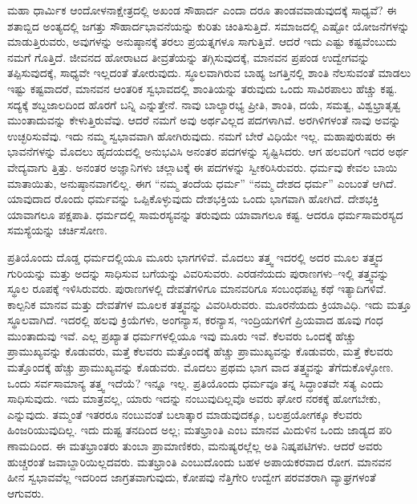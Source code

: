 ಮಹಾ ಧಾರ್ಮಿಕ ಆಂದೋಳನಾಕ್ಷೇತ್ರದಲ್ಲಿ ಅಖಂಡ ಸೌಹಾರ್ದ ಎಂದಾ ದರೂ ತಾಂಡವವಾಡುವುದಕ್ಕೆ ಸಾಧ್ಯವೆ? ಈ ಶತಾಬ್ದಿದ ಅಂತ್ಯದಲ್ಲಿ ಜಗತ್ತು ಸೌಹಾರ್ದಭಾವನೆಯನ್ನು ಕುರಿತು ಚಿಂತಿಸುತ್ತಿದೆ. ಸಮಾಜದಲ್ಲಿ ಎಷ್ಟೋ ಯೋಜನೆಗಳನ್ನು ಮಾಡುತ್ತಿರುವರು, ಅವುಗಳನ್ನು ಅನುಷ್ಠಾನಕ್ಕೆ ತರಲು ಪ್ರಯತ್ನಗಳೂ ಸಾಗುತ್ತಿವೆ. ಆದರೆ ಇದು ಎಷ್ಟು ಕಷ್ಟವೆಂಬುದು ನಮಗೆ ಗೊತ್ತಿದೆ. ಜೀವನದ ಹೋರಾಟದ ತೀವ್ರತೆಯನ್ನು ತಗ್ಗಿಸುವುದಕ್ಕೆ, ಮಾನವನ ಪ್ರಪಂಡ ಉದ್ವೇಗವನ್ನು ತಪ್ಪಿಸುವುದಕ್ಕೆ, ಸಾಧ್ಯವೇ ಇಲ್ಲದಂತೆ ತೋರುವುದು. ಸ್ಥೂಲವಾಗಿರುವ ಬಾಹ್ಯ ಜಗತ್ತಿನಲ್ಲಿ ಶಾಂತಿ ನೆಲಸುವಂತೆ ಮಾಡಲು ಇಷ್ಟು ಕಷ್ಟವಾದರೆ, ಮಾನವನ ಆಂತರಿಕ ಸ್ವಭಾವದಲ್ಲಿ ಶಾಂತಿಯನ್ನು ತರುವುದು ಒಂದು ಸಾವಿರಪಾಲು ಹೆಚ್ಚು ಕಷ್ಟ. ಸದ್ಯಕ್ಕೆ ಶಬ್ದಜಾಲದಿಂದ ಹೊರಗೆ ಬನ್ನಿ ಎನ್ನುತ್ತೇನೆ. ನಾವು ಬಾಲ್ಯಾರಭ್ಯ ಪ್ರೀತಿ, ಶಾಂತಿ, ದಯೆ, ಸಮತ್ವ, ವಿಶ್ವಭ್ರಾತೃತ್ವ ಮುಂತಾದುವನ್ನು ಕೇಳುತ್ತಿರುವೆವು. ಆದರೆ ನಮಗೆ ಅವು ಅರ್ಥವಿಲ್ಲದ ಪದಗಳಾಗಿವೆ. ಅರಗಿಳಿಗಳಂತೆ ನಾವು ಅವನ್ನು ಉಚ್ಛರಿಸುವೆವು. ಇದು ನಮ್ಮ ಸ್ವಭಾವವಾಗಿ ಹೋಗಿರುವುದು. ನಮಗೆ ಬೇರೆ ವಿಧಿಯೇ ಇಲ್ಲ. ಮಹಾಪುರುಷರು ಈ ಭಾವನೆಗಳನ್ನು ಮೊದಲು ಹೃದಯದಲ್ಲಿ ಅನುಭವಿಸಿ ಅನಂತರ ಪದಗಳನ್ನು ಸೃಷ್ಟಿಸಿದರು. ಆಗ ಹಲವರಿಗೆ ಇದರ ಅರ್ಥ ವೇದ್ಯವಾಗು ತ್ತಿತ್ತು. ಅನಂತರ ಅಜ್ಞಾನಿಗಳು ಚಲ್ಲಾಟಕ್ಕೆ ಈ ಪದಗಳನ್ನು ಸ್ವೀಕರಿಸಿರುವರು. ಧರ್ಮವು ಕೇವಲ ಬಾಯಿ ಮಾತಾಯಿತು, ಅನುಷ್ಠಾನವಾಗಲಿಲ್ಲ. ಈಗ “ನಮ್ಮ ತಂದೆಯ ಧರ್ಮ” “ನಮ್ಮ ದೇಶದ ಧರ್ಮ” ಎಂಬಂತೆ ಆಗಿದೆ. ಯಾವುದಾದ ರೊಂದು ಧರ್ಮವನ್ನು ಒಪ್ಪಿಕೊಳ್ಳುವುದು ದೇಶಭಕ್ತಿಯ ಒಂದು ಭಾಗವಾಗಿ ಹೋಗಿದೆ. ದೇಶಭಕ್ತಿ ಯಾವಾಗಲೂ ಪಕ್ಷಪಾತಿ. ಧರ್ಮದಲ್ಲಿ ಸಾಮರಸ್ಯವನ್ನು ತರುವುದು ಯಾವಾಗಲೂ ಕಷ್ಟ. ಆದರೂ ಧರ್ಮಸಾಮರಸ್ಯದ ಸಮಸ್ಯೆಯನ್ನು ಚರ್ಚಿಸೋಣ.

ಪ್ರತಿಯೊಂದು ದೊಡ್ಡ ಧರ್ಮದಲ್ಲಿಯೂ ಮೂರು ಭಾಗಗಳಿವೆ. ಮೊದಲು ತತ್ತ್ವ ಇದರಲ್ಲಿ ಅದರ ಮೂಲ ತತ್ತ್ವದ ಗುರಿಯನ್ನು ಮತ್ತು ಅದನ್ನು ಸಾಧಿಸುವ ಬಗೆಯನ್ನು ವಿವರಿಸುವರು. ಎರಡನೆಯದು ಪುರಾಣಗಳು–ಇಲ್ಲಿ ತತ್ತ್ವವನ್ನು ಸ್ಥೂಲ ರೂಪಕ್ಕೆ ಇಳಿಸಿರುವರು. ಪುರಾಣಗಳಲ್ಲಿ ದೇವತೆಗಳಿಗೂ ಮಾನವರಿಗೂ ಸಂಬಂಧಪಟ್ಟ ಕಥೆ ಇತ್ಯಾದಿಗಳಿವೆ. ಕಾಲ್ಪನಿಕ ಮಾನವ ಮತ್ತು ದೇವತೆಗಳ ಮೂಲಕ ತತ್ತ್ವವನ್ನು ವಿವರಿಸಿರುವರು. ಮೂರನೆಯದು ಕ್ರಿಯಾವಿಧಿ. ಇದು ಮತ್ತೂ ಸ್ಥೂಲವಾಗಿದೆ. ಇದರಲ್ಲಿ ಹಲವು ಕ್ರಿಯೆಗಳು, ಅಂಗನ್ಯಾಸ, ಕರನ್ಯಾಸ, ಇಂದ್ರಿಯಗಳಿಗೆ ಪ್ರಿಯವಾದ ಹೂವು ಗಂಧ ಮುಂತಾದುವು ಇವೆ. ಎಲ್ಲ ಪ್ರಖ್ಯಾತ ಧರ್ಮಗಳಲ್ಲಿಯೂ ಇವು ಮೂರು ಇವೆ. ಕೆಲವರು ಒಂದಕ್ಕೆ ಹೆಚ್ಚು ಪ್ರಾಮುಖ್ಯವನ್ನು ಕೊಡುವರು, ಮತ್ತೆ ಕೆಲವರು ಮತ್ತೊಂದಕ್ಕೆ ಹೆಚ್ಚು ಪ್ರಾಮುಖ್ಯವನ್ನು ಕೊಡುವರು, ಮತ್ತೆ ಕೆಲವರು ಮತ್ತೊಂದಕ್ಕೆ ಹೆಚ್ಚು ಪ್ರಾಮುಖ್ಯವನ್ನು ಕೊಡುವರು. ಮೊದಲು ಪ್ರಥಮ ಭಾಗ ವಾದ ತತ್ತ್ವವನ್ನು ತೆಗೆದುಕೊಳ್ಳೋಣ. ಒಂದು ಸರ್ವಸಾಮಾನ್ಯ ತತ್ತ್ವ ಇದೆಯೆ? ಇನ್ನೂ ಇಲ್ಲ. ಪ್ರತಿಯೊಂದು ಧರ್ಮವೂ ತನ್ನ ಸಿದ್ಧಾಂತವೇ ಸತ್ಯ ಎಂದು ಸಾಧಿಸುವುದು. ಇದು ಮಾತ್ರವಲ್ಲ, ಯಾರು ಇದನ್ನು ನಂಬುವುದಿಲ್ಲವೊ ಅವರು ಘೋರ ನರಕಕ್ಕೆ ಹೋಗಬೇಕು, ಎನ್ನುವುದು. ತಮ್ಮಂತೆ ಇತರರೂ ನಂಬುವಂತೆ ಬಲಾತ್ಕಾರ ಮಾಡುವುದಕ್ಕೂ, ಬಲಪ್ರಯೋಗಕ್ಕೂ ಕೆಲವರು ಹಿಂಜರಿಯುವುದಿಲ್ಲ. ಇದು ದುಷ್ಟ ತನದಿಂದ ಅಲ್ಲ; ಮತಭ್ರಾಂತಿ ಎಂಬ ಮಾನವ ಮಿದುಳಿನ ಒಂದು ಜಾಡ್ಯದ ಪರಿ ಣಾಮದಿಂದ. ಈ ಮತಭ್ರಾಂತರು ತುಂಬಾ ಪ್ರಾಮಾಣಿಕರು, ಮನುಷ್ಯರಲ್ಲೆಲ್ಲ ಅತಿ ನಿಷ್ಕಪಟಿಗಳು. ಆದರೆ ಅವರು ಹುಚ್ಚರಂತೆ ಜವಾಬ್ದಾರಿಯಿಲ್ಲದವರು. ಮತಭ್ರಾಂತಿ ಎಂಬುದೊಂದು ಬಹಳ ಅಪಾಯಕರವಾದ ರೋಗ. ಮಾನವನ ಹೀನ ಸ್ವಭಾವವೆಲ್ಲ ಇದರಿಂದ ಜಾಗ್ರತವಾಗುವುದು, ಕೋಪವು ನೆತ್ತಿಗೇರಿ ಉದ್ವೇಗ ಪರವಶರಾಗಿ ವ್ಯಾಘ್ರಗಳಂತೆ ಆಗುವರು.

